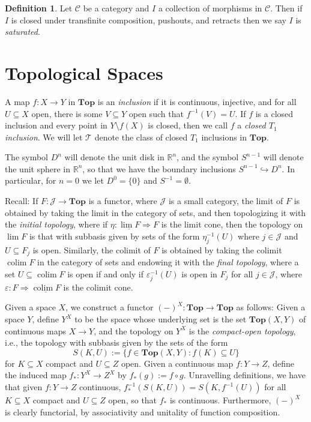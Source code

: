 \documentclass{amsart}
\theoremstyle{plain}
\theoremstyle{definition}
\newtheorem{definition}[theorem]{Definition}
\newcommand{\Top}{\mbf{Top}}
\newcommand{\sseq}{\subseteq}
\newcommand{\0}{\mathbf{0}}
\newcommand{\bR}{\mathbb{R}}
\newcommand{\cC}{\mathcal C}
\newcommand{\cJ}{\mathcal J}
\newcommand{\into}{\hookrightarrow}
\newcommand{\cT}{\mathcal T}
\newcommand{\mbf}[1]{\mathbf{#1}}
\newcommand{\vare}{\varepsilon}
\renewcommand{\(}{\left(}
\renewcommand{\)}{\right)}
\DeclareMathOperator*{\colim}{colim}
\begin{document}
\begin{definition}\label{saturated}
  Let $\cC$ be a category and $I$ a collection of morphisms in $\cC$. Then if $I$ is closed under transfinite composition, pushouts, and retracts then we say $I$ is \textit{saturated}.
\end{definition}

\section{Topological Spaces}

A map $f:X\to Y$ in $\Top$ is an \textit{inclusion} if it is continuous, injective, and for all $U\sseq X$ open, there is some $V\sseq Y$ open such that $f^{-1}(V)=U$. If $f$ is a closed inclusion and every point in $Y\setminus f(X)$ is closed, then we call $f$ a \textit{closed $T_1$ inclusion}. We will let $\cT$ denote the class of closed $T_1$ inclusions in $\Top$.

The symbol $D^n$ will denote the unit disk in $\bR^n$, and the symbol $S^{n-1}$ will denote the unit sphere in $\bR^n$, so that we have the boundary inclusions $S^{n-1}\into D^n$. In particular, for $n=0$ we let $D^0=\{0\}$ and $S^{-1}=\emptyset$.

Recall: If $F:\cJ\to\Top$ is a functor, where $\cJ$ is a small category, the limit of $F$ is obtained by taking the limit in the category of sets, and then topologizing it with the \textit{initial topology}, where if $\eta:\underline{\lim F}\Rightarrow F$ is the limit cone, then the topology on $\lim F$ is that with subbasis given by sets of the form $\eta_j^{-1}(U)$ where $j\in\cJ$ and $U\sseq F_j$ is open. Similarly, the colimit of $F$ is obtained by taking the colimit $\colim F$ in the category of sets and endowing it with the \textit{final topology}, where a set $U\sseq\colim F$ is open if and only if $\vare_j^{-1}(U)$ is open in $F_j$ for all $j\in\cJ$, where $\vare:F\Rightarrow\underline{\colim F}$ is the colimit cone.

Given a space $X$, we construct a functor $(-)^X:\Top\to\Top$ as follows: Given a space $Y$, define $Y^X$ to be the space whose underlying set is the set $\Top(X,Y)$ of continuous maps $X\to Y$, and the topology on $Y^X$ is the \textit{compact-open topology}, i.e., the topology with subbasis given by the sets of the form 
\[S(K,U):=\{f\in\Top(X,Y):f(K)\sseq U\}\]
for $K\sseq X$ compact and $U\sseq Z$ open. Given a continuous map $f:Y\to Z$, define the induced map $f_*:Y^X\to Z^X$ by $f_*(g):=f\circ g$. Unravelling definitions, we have that given $f:Y\to Z$ continuous, $f_*^{-1}(S(K,U))=S(K,f^{-1}(U))$ for all $K\sseq X$ compact and $U\sseq Z$ open, so that $f_*$ is continuous. Furthermore, $(-)^X$ is clearly functorial, by associativity and unitality of function composition.
\end{document}
